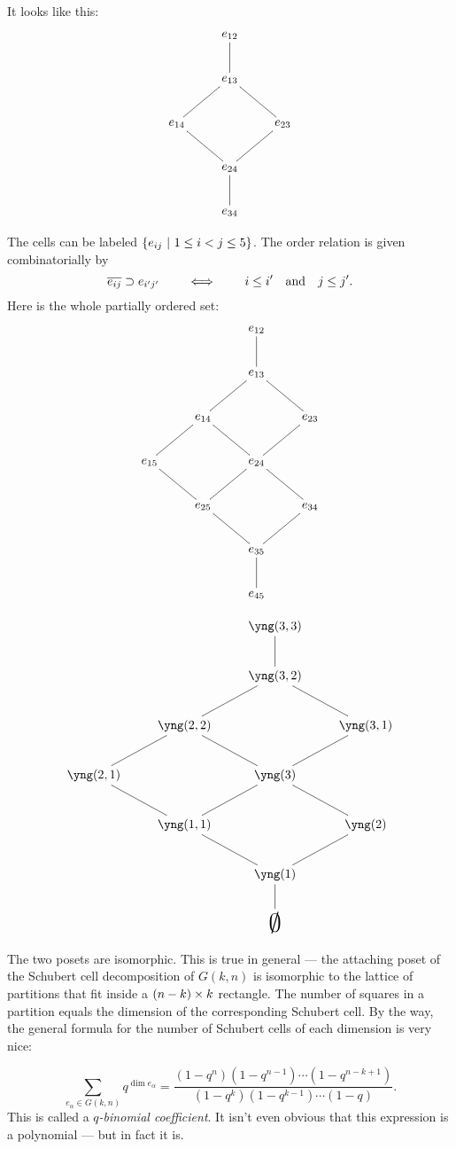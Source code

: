 It looks like this:
\[\xymatrix{
&e_{12}\ar@{-}[d]\\
&e_{13}\ar@{-}[dl]\ar@{-}[dr]\\
e_{14}\ar@{-}[dr]&&e_{23}\ar@{-}[dl]\\
&e_{24}\ar@{-}[d]\\
&e_{34}
}\]


The cells can be labeled $\{e_{ij} ~|~ 1\leq i<j\leq 5\}$.
The order relation is given combinatorially by
\[\overline{{e_{ij}}}\supset e_{i'j'}\qquad\iff\qquad i\leq i' \quad\text{and}\quad j\leq j'.\]
Here is the whole partially ordered set:
\[\xymatrix{
&&e_{12}\ar@{-}[d]\\
&&e_{13}\ar@{-}[dl]\ar@{-}[dr]\\
&e_{14}\ar@{-}[dl]\ar@{-}[dr]&&e_{23}\ar@{-}[dl]\\
e_{15}\ar@{-}[dr]&&e_{24}\ar@{-}[dl]\ar@{-}[dr]\\
&e_{25}\ar@{-}[dr]&&e_{34}\ar@{-}[dl]\\
&&e_{35}\ar@{-}[d]\\
&&e_{45}
}\]


\[\xymatrix{
&&{\yng(3,3)} \ar@{-}[d]\\
&&{\yng(3,2)}\ar@{-}[dl]\ar@{-}[dr]\\
&{\yng(2,2)}\ar@{-}[dl]\ar@{-}[dr]&&{\yng(3,1)}\ar@{-}[dl]\\
{\yng(2,1)}\ar@{-}[dr]&&{\yng(3)}\ar@{-}[dl]\ar@{-}[dr]\\
&{\yng(1,1)}\ar@{-}[dr]&&{\yng(2)}\ar@{-}[dl]\\
&&{\yng(1)}\ar@{-}[d]\\
&&\text{\huge$\0$}
}\]

The two posets are isomorphic.  This is true in general --- the attaching poset of the Schubert cell decomposition of $G(k,n)$ is isomorphic to the lattice of partitions that fit inside a $(n-k)\times k$ rectangle.  The number of squares in a partition equals the dimension of the corresponding Schubert cell.  By the way, the general formula for the number of Schubert cells of each dimension is very nice:

\[\sum_{e_\alpha\in G(k,n)} q^{\dim e_\alpha} = 
\frac{(1-q^n)(1-q^{n-1})\cdots(1-q^{n-k+1})}{(1-q^k)(1-q^{k-1})\cdots(1-q)}.\]
This is called a \emph{$q$-binomial coefficient}.  It isn't even obvious that this expression is a polynomial --- but in fact it is.

